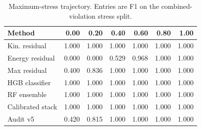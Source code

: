 \begin{table}[t]
\centering
\caption{Maximum-stress trajectory. Entries are F1 on the combined-violation stress split.}
\label{tab:stress}
\scriptsize
\begin{tabular}{lrrrrrr}
\toprule
Method & 0.00 & 0.20 & 0.40 & 0.60 & 0.80 & 1.00 \\
\midrule
Kin. residual & 1.000 & 1.000 & 1.000 & 1.000 & 1.000 & 1.000 \\
Energy residual & 0.000 & 0.000 & 0.529 & 0.968 & 1.000 & 1.000 \\
Max residual & 0.400 & 0.836 & 1.000 & 1.000 & 1.000 & 1.000 \\
HGB classifier & 1.000 & 1.000 & 1.000 & 1.000 & 1.000 & 1.000 \\
RF ensemble & 1.000 & 1.000 & 1.000 & 1.000 & 1.000 & 1.000 \\
Calibrated stack & 1.000 & 1.000 & 1.000 & 1.000 & 1.000 & 1.000 \\
Audit v5 & 0.420 & 0.815 & 1.000 & 1.000 & 1.000 & 1.000 \\
\bottomrule
\end{tabular}
\end{table}
